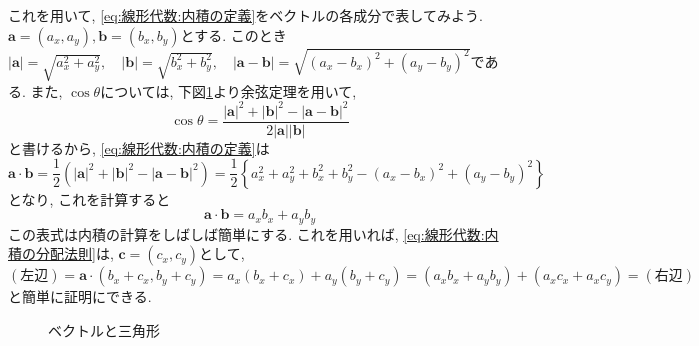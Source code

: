 \documentclass[a4j,dvipdfmx]{jsarticle}
\numberwithin{equation}{section}
\begin{document}
            これを用いて, \eqref{eq:線形代数:内積の定義}をベクトルの各成分で表してみよう. $\bm{a}=(a_x,a_y),\bm{b}=(b_x,b_y)$とする.
            このとき$|\bm{a}|=\sqrt{a_x^2+a_y^2},\quad|\bm{b}|=\sqrt{b_x^2+b_y^2},\quad |\bm{a}-\bm{b}|=\sqrt{(a_x-b_x)^2+(a_y-b_y)^2}$である.
            \clearpage
            また, $\cos\theta$については, 下図\ref{fig:線形代数:内積の証明用}より余弦定理を用いて, 
            \begin{equation*}
                \cos\theta = \frac{|\bm{a}|^2+|\bm{b}|^2-|\bm{a}-\bm{b}|^2}{2|\bm{a}||\bm{b}|}
            \end{equation*}
            と書けるから, \eqref{eq:線形代数:内積の定義}は
            \begin{equation*}
                \bm{a}\cdot\bm{b}=\frac{1}{2}\left(|\bm{a}|^2+|\bm{b}|^2-|\bm{a}-\bm{b}|^2\right)=\frac{1}{2}\left\{a_x^2+a_y^2+b_x^2+b_y^2-(a_x-b_x)^2+(a_y-b_y)^2\right\}
            \end{equation*}
            となり, これを計算すると
            \begin{equation}
                \bm{a}\cdot\bm{b}=a_xb_x+a_yb_y \label{eq:線形代数:内積の成分表示}
            \end{equation}
            この表式は内積の計算をしばしば簡単にする. これを用いれば, \eqref{eq:線形代数:内積の分配法則}は, $\bm{c}=(c_x,c_y)$として, 
            \begin{equation*}
                (左辺)=\bm{a}\cdot (b_x+c_x,b_y+c_y)=a_x(b_x+c_x)+a_y(b_y+c_y)=(a_xb_x+a_yb_y)+(a_xc_x+a_xc_y)=(右辺)
            \end{equation*}
            と簡単に証明にできる.

            \begin{figure}[h]
                \centering
                \caption{ベクトルと三角形} \label{fig:線形代数:内積の証明用}
            \end{figure}
\end{document}
